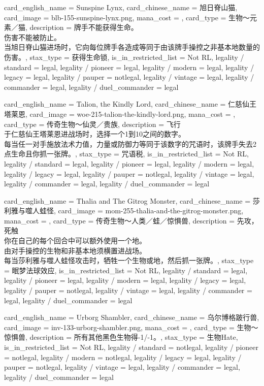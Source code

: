 \documentclass[lang = cn, color = black, 10pt]{AllThatStax}
\begin{document}
\card
{
	card_english_name = {Sunspine Lynx},
	card_chinese_name = {旭日脊山猫},
	card_image = blb-155-sunspine-lynx.png,
	mana_cost = ,
	card_type = 生物～元素／猫,
	description = {牌手不能获得生命。\\
伤害不能被防止。\\
当旭日脊山猫进场时，它向每位牌手各造成等同于由该牌手操控之非基本地数量的伤害。},
	stax_type = 获得生命锁,
	is_in_restricted_list = Not RL,
	legality / standard = legal,
	legality / pioneer = legal,
	legality / modern = legal,
	legality / legacy = legal,
	legality / pauper = notlegal,
	legality / vintage = legal,
	legality / commander = legal,
	legality / duel_commander = legal
}

\card
{
	card_english_name = {Talion, the Kindly Lord},
	card_chinese_name = {仁慈仙王塔莱恩},
	card_image = woe-215-talion-the-kindly-lord.png,
	mana_cost = ,
	card_type = 传奇生物～仙灵／贵族,
	description = {飞行\\
于仁慈仙王塔莱恩进战场时，选择一个1到10之间的数字。\\
每当任一对手施放法术力值，力量或防御力等同于该数字的咒语时，该牌手失去2点生命且你抓一张牌。},
	stax_type = 咒语税,
	is_in_restricted_list = Not RL,
	legality / standard = legal,
	legality / pioneer = legal,
	legality / modern = legal,
	legality / legacy = legal,
	legality / pauper = notlegal,
	legality / vintage = legal,
	legality / commander = legal,
	legality / duel_commander = legal
}

\card
{
	card_english_name = {Thalia and The Gitrog Monster},
	card_chinese_name = {莎利雅与噬人蛙怪},
	card_image = mom-255-thalia-and-the-gitrog-monster.png,
	mana_cost = ,
	card_type = 传奇生物～人类／蛙／惊惧兽,
	description = {先攻，死触\\
你在自己的每个回合中可以额外使用一个地。\\
由对手操控的生物和非基本地须横置进战场。\\
每当莎利雅与噬人蛙怪攻击时，牺牲一个生物或地，然后抓一张牌。},
	stax_type = 眠梦法球效应,
	is_in_restricted_list = Not RL,
	legality / standard = legal,
	legality / pioneer = legal,
	legality / modern = legal,
	legality / legacy = legal,
	legality / pauper = notlegal,
	legality / vintage = legal,
	legality / commander = legal,
	legality / duel_commander = legal
}

\card
{
	card_english_name = {Urborg Shambler},
	card_chinese_name = {乌尔博格跛行兽},
	card_image = inv-133-urborg-shambler.png,
	mana_cost = ,
	card_type = 生物～惊惧兽,
	description = {所有其他黑色生物得-1/-1。},
	stax_type = 生物Hate,
	is_in_restricted_list = Not RL,
	legality / standard = notlegal,
	legality / pioneer = notlegal,
	legality / modern = notlegal,
	legality / legacy = legal,
	legality / pauper = notlegal,
	legality / vintage = legal,
	legality / commander = legal,
	legality / duel_commander = legal
}
\end{document}
